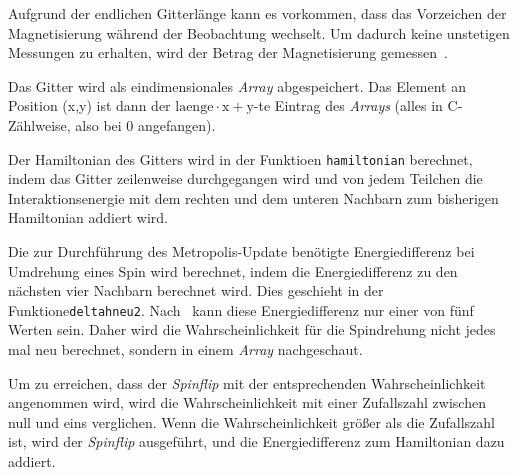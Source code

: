 	Aufgrund der endlichen Gitterlänge kann es vorkommen, dass das Vorzeichen der Magnetisierung während der Beobachtung wechselt. Um dadurch keine unstetigen Messungen zu erhalten, wird der Betrag der Magnetisierung gemessen~\cite[vgl. ][S. 106 ff.]{binderheermann}.%
	
	
	Das Gitter wird als eindimensionales \textit{Array} abgespeichert. Das Element an Position (x,y) ist dann der $\text{laenge}\cdot\text{x}+\text{y}$-te Eintrag des \textit{Arrays} (alles in C-Zählweise, also bei 0 angefangen).

	Der Hamiltonian des Gitters wird in der Funktioen \texttt{hamiltonian} berechnet, indem das Gitter zeilenweise durchgegangen wird und von jedem Teilchen die Interaktionsenergie mit dem rechten und dem unteren Nachbarn zum bisherigen Hamiltonian addiert wird.
	
	Die zur Durchführung des Metropolis-Update benötigte Energiedifferenz bei Umdrehung eines Spin wird berechnet, indem die Energiedifferenz zu den nächsten vier Nachbarn berechnet wird. Dies geschieht in der Funktione\texttt{deltahneu2}.
	Nach~\cite[S. 103]{binderheermann} kann diese Energiedifferenz nur einer von fünf Werten sein. Daher wird die Wahrscheinlichkeit für die Spindrehung nicht jedes mal neu berechnet, sondern in einem \textit{Array} nachgeschaut.
	
	Um zu erreichen, dass der \textit{Spinflip} mit der entsprechenden Wahrscheinlichkeit angenommen wird, wird die Wahrscheinlichkeit mit einer Zufallszahl zwischen null und eins verglichen\cite[nach][]{metropolisupdate}. Wenn die Wahrscheinlichkeit größer als die Zufallszahl ist, wird der \textit{Spinflip} ausgeführt, und die Energiedifferenz zum Hamiltonian dazu addiert. 
	
